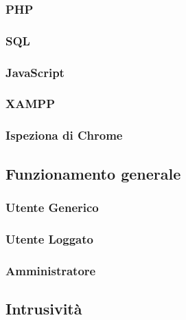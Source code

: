 \documentclass[a4paper]{article}
\begin{document}
			\subsubsection{PHP}
				
			\subsubsection{SQL}
				
			\subsubsection{JavaScript}
				
			\subsubsection{XAMPP}
				
			\subsubsection{Ispeziona di Chrome}
				
		\subsection{Funzionamento generale}
			
			\subsubsection{Utente Generico}
				
			\subsubsection{Utente Loggato}
				
			\subsubsection{Amministratore}
				
		\subsection{Intrusività}
			
		
\end{document}
